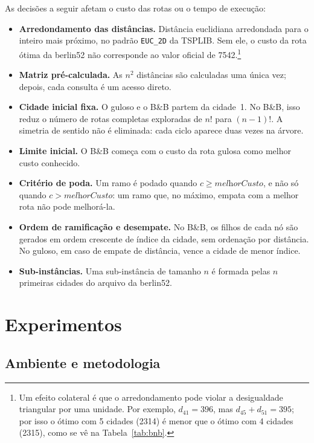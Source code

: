 \documentclass[12pt,a4paper]{article}
\newcommand{\algvar}[1]{\textit{#1}}
\begin{document}
As decisões a seguir afetam o custo das rotas ou o tempo de execução:
\begin{itemize}
  \item \textbf{Arredondamento das distâncias.} Distância euclidiana arredondada para o inteiro mais próximo, no padrão \texttt{EUC\_2D} da TSPLIB. Sem ele, o custo da rota ótima da berlin52 não corresponde ao valor oficial de 7542.\footnote{Um efeito colateral é que o arredondamento pode violar a desigualdade triangular por uma unidade. Por exemplo, $d_{41} = 396$, mas $d_{45} + d_{51} = 395$; por isso o ótimo com 5 cidades (2314) é menor que o ótimo com 4 cidades (2315), como se vê na Tabela~\ref{tab:bnb}.}
  \item \textbf{Matriz pré-calculada.} As $n^2$ distâncias são calculadas uma única vez; depois, cada consulta é um acesso direto.
  \item \textbf{Cidade inicial fixa.} O guloso e o B\&B partem da cidade~1. No B\&B, isso reduz o número de rotas completas exploradas de $n!$ para $(n-1)!$. A simetria de sentido não é eliminada: cada ciclo aparece duas vezes na árvore.
  \item \textbf{Limite inicial.} O B\&B começa com o custo da rota gulosa como melhor custo conhecido.
  \item \textbf{Critério de poda.} Um ramo é podado quando $c \ge \algvar{melhorCusto}$, e não só quando $c > \algvar{melhorCusto}$: um ramo que, no máximo, empata com a melhor rota não pode melhorá-la.
  \item \textbf{Ordem de ramificação e desempate.} No B\&B, os filhos de cada nó são gerados em ordem crescente de índice da cidade, sem ordenação por distância. No guloso, em caso de empate de distância, vence a cidade de menor índice.
  \item \textbf{Sub-instâncias.} Uma sub-instância de tamanho $n$ é formada pelas $n$ primeiras cidades do arquivo da berlin52.
\end{itemize}

\section{Experimentos}\label{sec:experimentos}

\subsection{Ambiente e metodologia}
\end{document}
